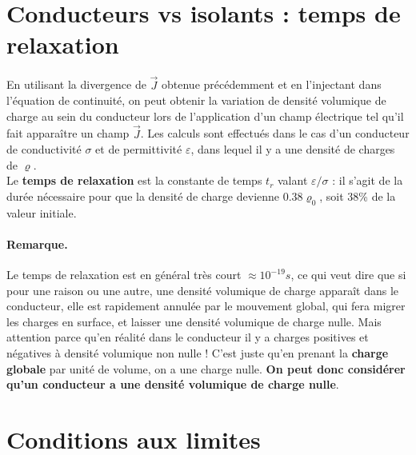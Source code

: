 \documentclass[12pt]{book}
\begin{document}
\section{Conducteurs vs isolants : temps de relaxation}

En utilisant la divergence de $\vec{J}$ obtenue précédemment et en l'injectant dans l'équation de continuité, on peut obtenir la variation de densité volumique de charge au sein du conducteur lors de l'application d'un champ électrique tel qu'il fait apparaître un champ $\vec{J}$. Les calculs sont effectués dans le cas d'un conducteur de conductivité $\sigma$ et de permittivité $\varepsilon$, dans lequel il y a une densité de charges de $\varrho$. \\

 Le \textbf{temps de relaxation} est la constante de temps $t_r$ valant $\varepsilon/\sigma$ : il s'agit de la durée nécessaire pour que la densité de charge devienne $0.38 \varrho_0$, soit 38\% de la valeur initiale.
 
 \paragraph{Remarque.} Le temps de relaxation est en général très court $\approx 10^{-19}s$, ce qui veut dire que si pour une raison ou une autre, une densité volumique de charge apparaît dans le conducteur, elle est rapidement annulée par le mouvement global, qui fera migrer les charges en surface, et laisser une densité volumique de charge nulle. Mais attention parce qu'en réalité dans le conducteur il y a charges positives et négatives à densité volumique non nulle ! C'est juste qu'en prenant la \textbf{charge globale} par unité de volume, on a une charge nulle. \textbf{On peut donc considérer qu'un conducteur a une densité volumique de charge nulle}.

\section{Conditions aux limites}
\end{document}
